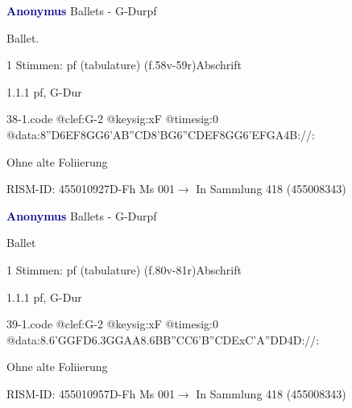 \documentclass[twocolumn, 12pt]{book}
\begin{document}
\par \vspace{16pt} \textcolor{darkblue}{\textbf{Anonymus  }}\hfillplus{\textbf{[38]}}\newline Ballets - G-Dur\newline pf
\par \begin{itshape}[f.58v, at left:] Ballet.\end{itshape} 
\par \textcolor{darkblue}{}  1 Stimmen: pf (tabulature)  (f.58v-59r)\newline Abschrift
\par 1.1.1  pf, G-Dur  
\begin{filecontents*}{38-1.code}
@clef:G-2
@keysig:xF
@timesig:0
@data:{8''D6EF8GG}{6'AB''CD}{8'BG}{6''CDEF}{8GG}{6'EFGA}4B://:
\end{filecontents*}
\newline %
\par Ohne alte Foliierung
\par RISM-ID: 455010927\newline D-Fh  Ms 001\newline $\rightarrow$ In Sammlung 418 (455008343)
      
\par \vspace{16pt} \textcolor{darkblue}{\textbf{Anonymus  }}\hfillplus{\textbf{[39]}}\newline Ballets - G-Dur\newline pf
\par \begin{itshape}[f.80v, at left:] Ballet\end{itshape} 
\par \textcolor{darkblue}{}  1 Stimmen: pf (tabulature)  (f.80v-81r)\newline Abschrift
\par 1.1.1  pf, G-Dur  
\begin{filecontents*}{39-1.code}
@clef:G-2
@keysig:xF
@timesig:0
@data:8.6{'GG}{FD}{6.3GGAA}{8.6BB}{''CC}{6'B''CDE}{xC'A''DD}4D://:
\end{filecontents*}
\newline %
\par Ohne alte Foliierung
\par RISM-ID: 455010957\newline D-Fh  Ms 001\newline $\rightarrow$ In Sammlung 418 (455008343)
      
\end{document}
